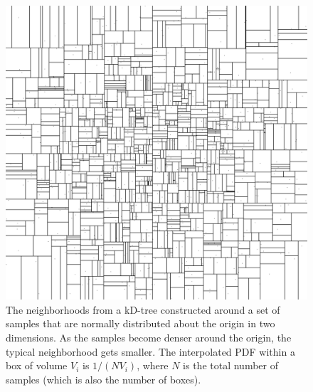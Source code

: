 \documentclass{rsos}
\begin{document}
\begin{figure}
  \begin{center}
    \includegraphics[width=0.8\columnwidth]{Figure1_kdtree}
  \end{center}
  \caption{\label{fig:kD-tree} The neighborhoods from a kD-tree
    constructed around a set of samples that are normally distributed
    about the origin in two dimensions.  As the samples become denser
    around the origin, the typical neighborhood gets smaller.  The
    interpolated PDF within a box of volume $V_i$ is $1/(N V_i)$,
    where $N$ is the total number of samples (which is also the number
    of boxes).}
\end{figure}
\end{document}
